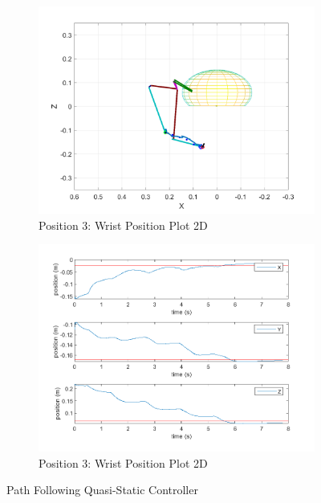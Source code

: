 \begin{figure}[ht]
    \begin{subfigure}[b]{0.45\textwidth}
        \includegraphics[width=0.8\linewidth]{Pictures/Controller/QSC/20_wp.png}
        \caption{Position 3: Wrist Position Plot 2D}
    \end{subfigure}%
    \hfill
    \begin{subfigure}[b]{0.45\textwidth}
        \includegraphics[width=0.8\linewidth]{Pictures/Controller/QSC/20.png}
        \caption{Position 3: Wrist Position Plot 2D}
    \end{subfigure}

    \caption{Path Following Quasi-Static Controller}
    \label{fig:pfqscwp}
\end{figure}

